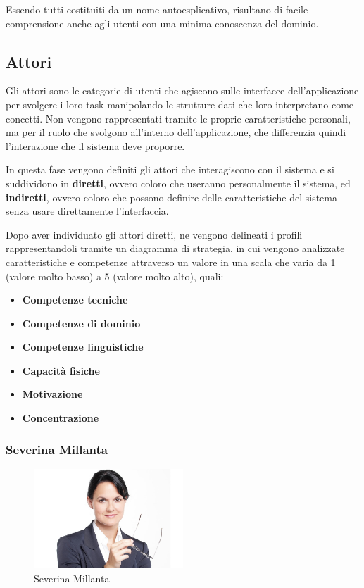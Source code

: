 \documentclass[12pt,italian,]{report}
\providecommand{\tightlist}{%
  \setlength{\itemsep}{0pt}\setlength{\parskip}{0pt}}
\begin{document}
Essendo tutti costituiti da un nome autoesplicativo, risultano di facile comprensione anche agli utenti con una minima conoscenza del dominio.

\hypertarget{attori}{%
\subsection{Attori}\label{attori}}

Gli attori sono le categorie di utenti che agiscono sulle interfacce
dell'applicazione per svolgere i loro task manipolando le strutture dati
che loro interpretano come concetti. Non vengono rappresentati tramite
le proprie caratteristiche personali, ma per il ruolo che svolgono
all'interno dell'applicazione, che differenzia quindi l'interazione che
il sistema deve proporre.

In questa fase vengono definiti gli attori che interagiscono con il
sistema e si suddividono in \textbf{diretti}, ovvero coloro che
useranno personalmente il sistema, ed \textbf{indiretti}, ovvero coloro
che possono definire delle caratteristiche del sistema senza usare
direttamente l'interfaccia.

Dopo aver individuato gli attori diretti, ne vengono delineati i profili
rappresentandoli tramite un diagramma di strategia, in cui vengono
analizzate caratteristiche e competenze attraverso un valore in una
scala che varia da 1 (valore molto basso) a 5 (valore molto alto),
quali:

\begin{itemize}
\tightlist
\item
  \textbf{Competenze tecniche}
\item
  \textbf{Competenze di dominio}
\item
  \textbf{Competenze linguistiche}
\item
  \textbf{Capacità fisiche}
\item
  \textbf{Motivazione}
\item
  \textbf{Concentrazione}
\end{itemize}

\hypertarget{severina-millanta-1}{%
\subsubsection{Severina Millanta}\label{severina-millanta-1}}

\begin{figure}[h]
\centering
\includegraphics[width=0.5\textwidth,height=\textheight]{img/severina.jpg}
\caption{Severina Millanta}
\end{figure}
\end{document}

